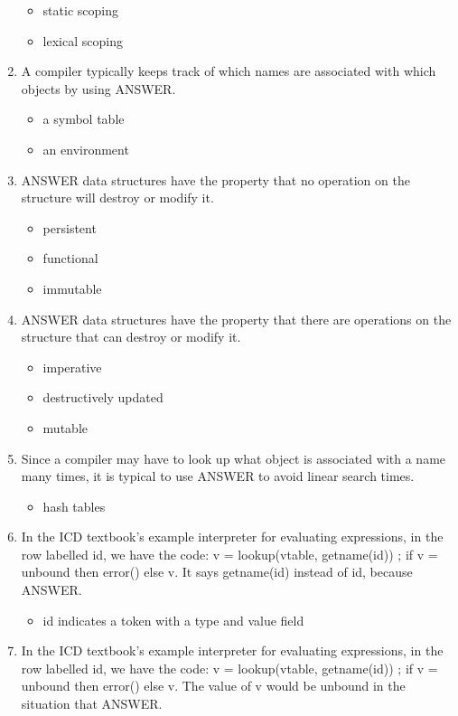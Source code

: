 \documentclass{exam}
\begin{document}
\begin{enumerate}
\begin{itemize}
\item static scoping
\item lexical scoping
\end{itemize}
\item A compiler typically keeps track of which names are associated with which objects by using ANSWER.
\begin{itemize}
\item a symbol table
\item an environment
\end{itemize}
\item ANSWER data structures have the property that no operation on the structure will destroy or modify it.
\begin{itemize}
\item persistent
\item functional
\item immutable
\end{itemize}
\item ANSWER data structures have the property that there are operations on the structure that can destroy or modify it.
\begin{itemize}
\item imperative
\item destructively updated
\item mutable
\end{itemize}
\item Since a compiler may have to look up what object is associated with a name many times, it is typical to use ANSWER to avoid linear search times.
\begin{itemize}
\item hash tables
\end{itemize}
\item In the ICD textbook's example interpreter for evaluating expressions, in the row labelled id, we have the code: v = lookup(vtable, getname(id)) ; if v = unbound then error() else v.  It says getname(id) instead of id, because ANSWER.
\begin{itemize}
\item id indicates a token with a type and value field
\end{itemize}
\item In the ICD textbook's example interpreter for evaluating expressions, in the row labelled id, we have the code: v = lookup(vtable, getname(id)) ; if v = unbound then error() else v.  The value of v would be unbound in the situation that ANSWER.

\end{enumerate}
\end{document}
